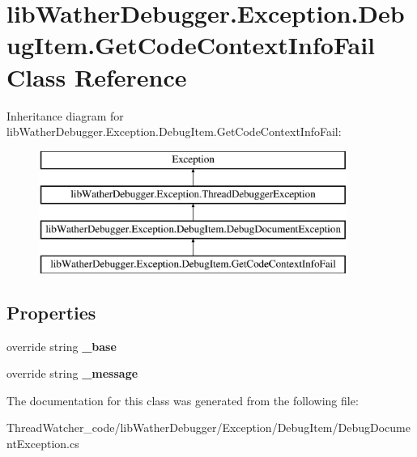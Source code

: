 \hypertarget{classlib_wather_debugger_1_1_exception_1_1_debug_item_1_1_get_code_context_info_fail}{\section{lib\+Wather\+Debugger.\+Exception.\+Debug\+Item.\+Get\+Code\+Context\+Info\+Fail Class Reference}
\label{classlib_wather_debugger_1_1_exception_1_1_debug_item_1_1_get_code_context_info_fail}
}
Inheritance diagram for lib\+Wather\+Debugger.\+Exception.\+Debug\+Item.\+Get\+Code\+Context\+Info\+Fail\+:\begin{figure}[H]
\begin{center}
\leavevmode
\includegraphics[height=4.000000cm]{classlib_wather_debugger_1_1_exception_1_1_debug_item_1_1_get_code_context_info_fail}
\end{center}
\end{figure}
\subsection*{Properties}
\begin{DoxyCompactItemize}
\item 
\hypertarget{classlib_wather_debugger_1_1_exception_1_1_debug_item_1_1_get_code_context_info_fail_a516bc3720c7a74c22db6fcfcd5812d47}{override string {\bfseries \+\_\+base}}\label{classlib_wather_debugger_1_1_exception_1_1_debug_item_1_1_get_code_context_info_fail_a516bc3720c7a74c22db6fcfcd5812d47}

\item 
\hypertarget{classlib_wather_debugger_1_1_exception_1_1_debug_item_1_1_get_code_context_info_fail_acb176ef0b2e52a46f61d38979a2e63eb}{override string {\bfseries \+\_\+message}}\label{classlib_wather_debugger_1_1_exception_1_1_debug_item_1_1_get_code_context_info_fail_acb176ef0b2e52a46f61d38979a2e63eb}

\end{DoxyCompactItemize}


The documentation for this class was generated from the following file\+:\begin{DoxyCompactItemize}
\item 
Thread\+Watcher\+\_\+code/lib\+Wather\+Debugger/\+Exception/\+Debug\+Item/Debug\+Document\+Exception.\+cs\end{DoxyCompactItemize}
